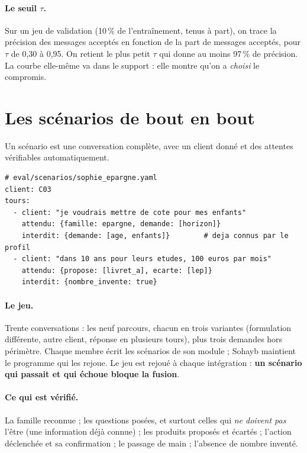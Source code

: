 \paragraph{Le seuil $\tau$.} Sur un jeu de validation (10\,\% de l'entraînement, tenus à part), on
trace la précision des messages acceptés en fonction de la part de messages acceptés, pour $\tau$
de 0,30 à 0,95. On retient le plus petit $\tau$ qui donne au moins 97\,\% de précision. La courbe
elle-même va dans le support : elle montre qu'on a \emph{choisi} le compromis.

\section{Les scénarios de bout en bout}

Un scénario est une conversation complète, avec un client donné et des attentes vérifiables
automatiquement.

\begin{code}
\footnotesize
\begin{verbatim}
# eval/scenarios/sophie_epargne.yaml
client: C03
tours:
  - client: "je voudrais mettre de cote pour mes enfants"
    attendu: {famille: epargne, demande: [horizon]}
    interdit: {demande: [age, enfants]}        # deja connus par le profil
  - client: "dans 10 ans pour leurs etudes, 100 euros par mois"
    attendu: {propose: [livret_a], ecarte: [lep]}
    interdit: {nombre_invente: true}
\end{verbatim}
\end{code}

\paragraph{Le jeu.} Trente conversations : les neuf parcours, chacun en trois variantes
(formulation différente, autre client, réponse en plusieurs tours), plus trois demandes hors
périmètre. Chaque membre écrit les scénarios de son module ; Sohayb maintient le programme qui les
rejoue. Le jeu est rejoué à chaque intégration : \textbf{un scénario qui passait et qui échoue
bloque la fusion}.

\paragraph{Ce qui est vérifié.} La famille reconnue ; les questions posées, et surtout celles qui
\emph{ne doivent pas} l'être (une information déjà connue) ; les produits proposés et écartés ;
l'action déclenchée et sa confirmation ; le passage de main ; l'absence de nombre inventé.

